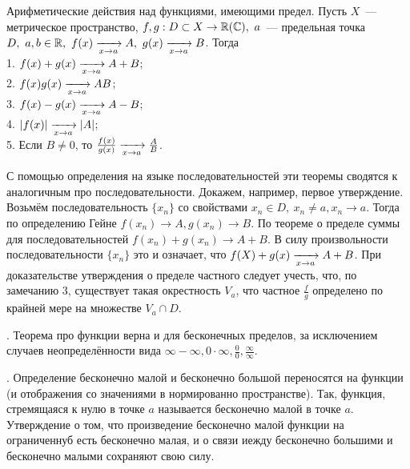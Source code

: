 \T \q Арифметические действия над функциями, имеющими предел. Пусть $X$~--- метрическое пространство, $f, g: D \subset X \to \mathbb{R}(\mathbb{C}),\ a$~--- предельная точка $D,\ a, b \in\R,\ f(x) \t A,\ g(x)\t B$. Тогда\\
1. $f(x) + g(x) \xrightarrow[x\to a]{} A + B$;\\
2. $f(x)g(x) \xrightarrow[x\to a]{} A B$;\\
3. $f(x) - g(x) \xrightarrow[x\to a]{} A - B$;\\
4. $|f(x)| \xrightarrow[x\to a]{} |A|$;\\
5. Если $B \neq 0$, то $\frac{f(x)}{g(x)} \xrightarrow[x\to a]{} \frac AB$.

\D С помощью определения на языке последовательностей эти теоремы сводятся к аналогичным про последовательности. Докажем, например, первое утверждение. Возьмём последовательность $\{x_n\}$ со свойствами $x_n \in D,\ x_n \neq a, x_n \to a$. Тогда по определению Гейне $f(x_n) \to A, g(x_n) \to B$. По теореме о пределе суммы для последовательностей $f(x_n) + g(x_n) \to A + B$. В силу произвольности последовательности $\{x_n\}$ это и означает, что $f(X) + g(x) \xrightarrow[x\to a]{} A + B$. При доказательстве утверждения о пределе частного следует учесть, что, по замечанию 3, существует такая окрестность $V_a$, что частное $\frac fg$ определено по крайней мере на множестве $V_a \cap D$.

. Теорема про функции верна и для бесконечных пределов, за исключением случаев неопределённости вида $\infty - \infty, 0\cdot\infty, \frac 00, \frac\infty\infty$.

. Определение бесконечно малой и бесконечно большой переносятся на функции (и отображения со значениями в нормированно пространстве). Так, функция, стремящаяся к нулю в точке $a$ называется бесконечно малой в точке $a$. Утверждение о том, что  произведение бесконечно малой функции на ограниченнуб есть бесконечно малая, и о связи иежду бесконечно большими и бесконечно малыми сохраняют свою силу.